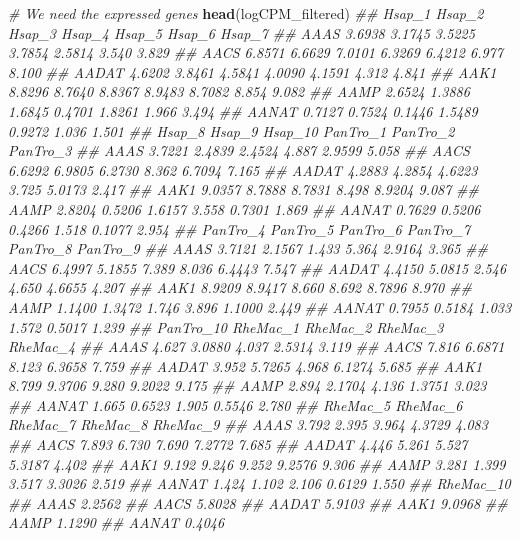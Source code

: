 \documentclass[]{book}
\newenvironment{Shaded}{\begin{snugshade}}{\end{snugshade}}
\newcommand{\CommentTok}[1]{\textcolor[rgb]{0.56,0.35,0.01}{\textit{#1}}}
\newcommand{\KeywordTok}[1]{\textcolor[rgb]{0.13,0.29,0.53}{\textbf{#1}}}
\newcommand{\NormalTok}[1]{#1}
\begin{document}
\begin{Shaded}
\begin{Highlighting}[]

\CommentTok{# We need the expressed genes}
\KeywordTok{head}\NormalTok{(logCPM_filtered)}
\CommentTok{##       Hsap_1 Hsap_2 Hsap_3 Hsap_4 Hsap_5 Hsap_6 Hsap_7}
\CommentTok{## AAAS  3.6938 3.1745 3.5225 3.7854 2.5814  3.540  3.829}
\CommentTok{## AACS  6.8571 6.6629 7.0101 6.3269 6.4212  6.977  8.100}
\CommentTok{## AADAT 4.6202 3.8461 4.5841 4.0090 4.1591  4.312  4.841}
\CommentTok{## AAK1  8.8296 8.7640 8.8367 8.9483 8.7082  8.854  9.082}
\CommentTok{## AAMP  2.6524 1.3886 1.6845 0.4701 1.8261  1.966  3.494}
\CommentTok{## AANAT 0.7127 0.7524 0.1446 1.5489 0.9272  1.036  1.501}
\CommentTok{##       Hsap_8 Hsap_9 Hsap_10 PanTro_1 PanTro_2 PanTro_3}
\CommentTok{## AAAS  3.7221 2.4839  2.4524    4.887   2.9599    5.058}
\CommentTok{## AACS  6.6292 6.9805  6.2730    8.362   6.7094    7.165}
\CommentTok{## AADAT 4.2883 4.2854  4.6223    3.725   5.0173    2.417}
\CommentTok{## AAK1  9.0357 8.7888  8.7831    8.498   8.9204    9.087}
\CommentTok{## AAMP  2.8204 0.5206  1.6157    3.558   0.7301    1.869}
\CommentTok{## AANAT 0.7629 0.5206  0.4266    1.518   0.1077    2.954}
\CommentTok{##       PanTro_4 PanTro_5 PanTro_6 PanTro_7 PanTro_8 PanTro_9}
\CommentTok{## AAAS    3.7121   2.1567    1.433    5.364   2.9164    3.365}
\CommentTok{## AACS    6.4997   5.1855    7.389    8.036   6.4443    7.547}
\CommentTok{## AADAT   4.4150   5.0815    2.546    4.650   4.6655    4.207}
\CommentTok{## AAK1    8.9209   8.9417    8.660    8.692   8.7896    8.970}
\CommentTok{## AAMP    1.1400   1.3472    1.746    3.896   1.1000    2.449}
\CommentTok{## AANAT   0.7955   0.5184    1.033    1.572   0.5017    1.239}
\CommentTok{##       PanTro_10 RheMac_1 RheMac_2 RheMac_3 RheMac_4}
\CommentTok{## AAAS      4.627   3.0880    4.037   2.5314    3.119}
\CommentTok{## AACS      7.816   6.6871    8.123   6.3658    7.759}
\CommentTok{## AADAT     3.952   5.7265    4.968   6.1274    5.685}
\CommentTok{## AAK1      8.799   9.3706    9.280   9.2022    9.175}
\CommentTok{## AAMP      2.894   2.1704    4.136   1.3751    3.023}
\CommentTok{## AANAT     1.665   0.6523    1.905   0.5546    2.780}
\CommentTok{##       RheMac_5 RheMac_6 RheMac_7 RheMac_8 RheMac_9}
\CommentTok{## AAAS     3.792    2.395    3.964   4.3729    4.083}
\CommentTok{## AACS     7.893    6.730    7.690   7.2772    7.685}
\CommentTok{## AADAT    4.446    5.261    5.527   5.3187    4.402}
\CommentTok{## AAK1     9.192    9.246    9.252   9.2576    9.306}
\CommentTok{## AAMP     3.281    1.399    3.517   3.3026    2.519}
\CommentTok{## AANAT    1.424    1.102    2.106   0.6129    1.550}
\CommentTok{##       RheMac_10}
\CommentTok{## AAAS     2.2562}
\CommentTok{## AACS     5.8028}
\CommentTok{## AADAT    5.9103}
\CommentTok{## AAK1     9.0968}
\CommentTok{## AAMP     1.1290}
\CommentTok{## AANAT    0.4046}


\end{Highlighting}
\end{Shaded}
\end{document}
